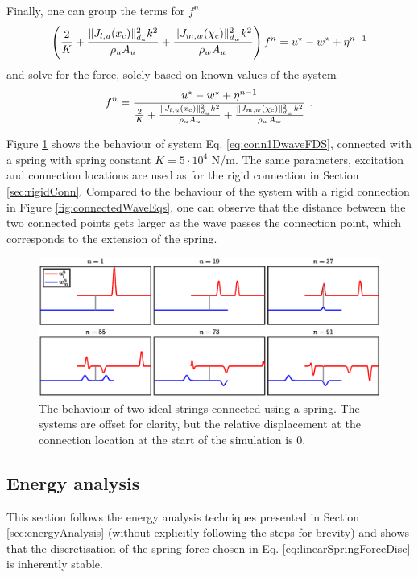 Finally, one can group the terms for $f^n$ 
\begin{equation*}
    \left(\frac{2}{K} + \frac{\lVert J_{l, u}(x_{\text{c}})\rVert_{d_u}^2k^2}{\rho_u A_u} +  \frac{\lVert J_{m, w}(\chi_{\text{c}})\rVert_{d_w}^2k^2}{\rho_w A_w}\right)f^n = u^\star - w^\star + \eta^{n-1}
\end{equation*}
and solve for the force, solely based on known values of the system
\begin{equation}
    f^n = \frac{u^\star - w^\star + \eta^{n-1}}{\frac{2}{K} + \frac{\lVert J_{l, u}(x_{\text{c}})\rVert_{d_u}^2k^2}{\rho_u A_u} +  \frac{\lVert J_{m, w}(\chi_{\text{c}})\rVert_{d_w}^2k^2}{\rho_w A_w}}\ .
\end{equation}

Figure \ref{fig:connectedWaveEqsSpring} shows the behaviour of system Eq. \eqref{eq:conn1DwaveFDS}, connected with a spring with spring constant $K = 5\cdot 10^4$ N/m. The same parameters, excitation and connection locations are used as for the rigid connection in Section \ref{sec:rigidConn}. Compared to the behaviour of the system with a rigid connection in Figure \ref{fig:connectedWaveEqs}, one can observe that the distance between the two connected points gets larger as the wave passes the connection point, which corresponds to the extension of the spring. 

\begin{figure}[h]
    \includegraphics[width=\textwidth]{figures/interactions/connectedWaveEqsSpring.eps}
    \caption{The behaviour of two ideal strings connected using a spring. The systems are offset for clarity, but the relative displacement at the connection location at the start of the simulation is 0. \label{fig:connectedWaveEqsSpring}}
\end{figure}

\subsection{Energy analysis}\label{sec:conn1DwaveEnergySpring}
This section follows the energy analysis techniques presented in Section \ref{sec:energyAnalysis} (without explicitly following the steps for brevity) and shows that the discretisation of the spring force chosen in Eq. \eqref{eq:linearSpringForceDisc} is inherently stable. 

